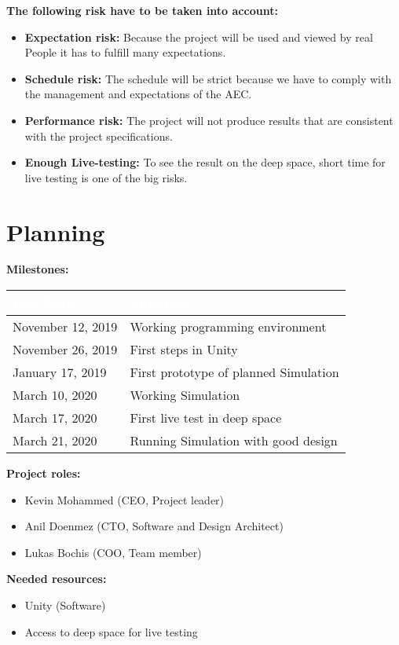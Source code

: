 \documentclass[12pt]{article}
\theoremstyle{definition}
\begin{document}
\textbf{The following risk have to be taken into account:}
\begin{itemize}
\item \textbf{Expectation risk:} Because the project will be used and viewed by real People it has to fulfill many expectations.
\item \textbf{Schedule risk:} The schedule will be strict because we have to comply with the management and expectations of the AEC.
\item \textbf{Performance risk:} The project will not produce results that are consistent with the project specifications.
\item \textbf{Enough Live-testing:} To see the result on the deep space, short time for live testing is one of the big risks.
\end{itemize}

\pagebreak
\section{Planning}

\textbf{Milestones:}
\newline

\begin{tabular}{|l|l|}
\hline
\cellcolor[gray]{0.5}\textcolor{white}{Due Date} & \cellcolor[gray]{0.5}\textcolor{white}{Milestone} \\ \hline
November 12, 2019&Working programming environment \\ \hline
November 26, 2019&First steps in Unity\\ \hline
January 17, 2019&First prototype of planned Simulation \\ \hline
March 10, 2020&Working Simulation \\ \hline
March 17, 2020&First live test in deep space\\ \hline
March 21, 2020&Running Simulation with good design\\ \hline
\end{tabular}


\textbf{Project roles:}
\begin{itemize}
    \item Kevin Mohammed (CEO, Project leader)
    \item Anil Doenmez (CTO, Software and Design Architect)
    \item Lukas Bochis (COO, Team member)
\end{itemize}

\textbf{Needed resources:}
\begin{itemize}
    \item Unity (Software)
    \item Access to deep space for live testing
\end{itemize}
\end{document}
